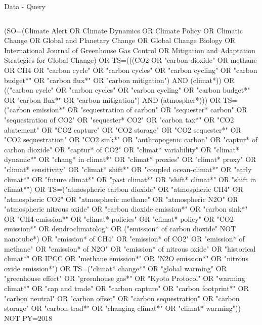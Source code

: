 \documentclass[9pt]{beamer}
\begin{document}

\begin{frame}{Data - Query}
\begin{columns}
\begin{column}{0.65\linewidth}
\tiny
(SO=(Climate Alert OR Climate Dynamics OR Climate Policy OR Climatic Change OR Global and Planetary Change OR Global Change Biology OR International Journal of Greenhouse Gas Control OR Mitigation and Adaptation Strategies for Global Change) OR TS=(((CO2 OR "carbon dioxide" OR methane OR CH4 OR "carbon cycle" OR "carbon cycles" OR "carbon cycling" OR "carbon budget*" OR "carbon flux*" OR "carbon mitigation") AND (climat*)) OR (("carbon cycle" OR "carbon cycles" OR "carbon cycling" OR "carbon budget*" OR "carbon flux*" OR "carbon mitigation") AND (atmospher*))) OR TS=("carbon emission*" OR "sequestration of carbon" OR "sequester* carbon" OR "sequestration of CO2" OR "sequester* CO2" OR "carbon tax*" OR "CO2 abatement" OR "CO2 capture" OR "CO2 storage" OR "CO2 sequester*" OR "CO2 sequestration" OR "CO2 sink*" OR "anthropogenic carbon" OR "captur* of carbon dioxide" OR "captur* of CO2" OR "climat* variability" OR "climat* dynamic*" OR "chang* in climat*" OR "climat* proxies" OR "climat* proxy" OR "climat* sensitivity" OR "climat* shift*" OR "coupled ocean-climat*" OR "early climat*" OR "future climat*" OR "past climat*" OR "shift* climat*" OR "shift in climat*") OR TS=("atmospheric carbon dioxide" OR "atmospheric CH4" OR "atmospheric CO2" OR "atmospheric methane" OR "atmospheric N2O" OR "atmospheric nitrous oxide" OR "carbon dioxide emission*" OR "carbon sink*" OR "CH4 emission*" OR "climat* policies" OR "climat* policy" OR "CO2 emission*" OR dendroclimatolog* OR ("emission* of carbon dioxide" NOT nanotube*) OR "emission* of CH4" OR "emission* of CO2" OR "emission* of methane" OR "emission* of N2O" OR "emission* of nitrous oxide" OR "historical climat*" OR IPCC OR "methane emission*" OR "N2O emission*" OR "nitrous oxide emission*") OR TS=("climat* change*" OR "global warming" OR "greenhouse effect" OR "greenhouse gas*" OR "Kyoto Protocol" OR "warming climat*" OR "cap and trade" OR "carbon capture" OR "carbon footprint*" OR "carbon neutral" OR "carbon offset" OR "carbon sequestration" OR "carbon storage" OR "carbon trad*" OR "changing climat*" OR "climat* warming")) NOT PY=2018


\end{column}
\end{columns}
\end{frame}
\end{document}
